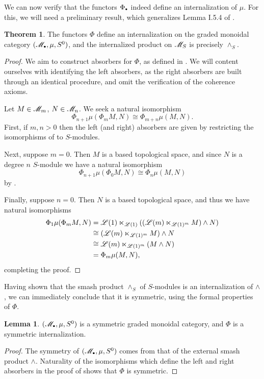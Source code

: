 \documentclass[openany, amssymb, psamsfonts]{amsart}
\theoremstyle{definition}
\newtheorem{thm}{Theorem}[section]
\newtheorem{lem}{Lemma}[section]
\numberwithin{equation}{section}
\begin{document}
We can now verify that the functors $\Phi_\sbull$ indeed define an internalization of $\mu$. For this, we will need a preliminary result, which generalizes Lemma I.5.4 of \cite{EKMM}. 

\begin{thm}\label{thm:wedgeS_internal}
    The functors $\Phi$ define an internalization on the graded monoidal category $(\scM_\sbull, \mu, S^0)$, and the internalized product on $\mathscr{M}_S$ is precisely $\wedge_S$.
\end{thm}
\begin{proof} We aim to construct absorbers for $\Phi$, as defined in . We will content ourselves with identifying the left absorbers, as the right absorbers are built through an identical procedure, and omit the verification of the coherence axioms. 

Let $M \in \mathscr{M}_m$, $N \in \mathscr{M}_n$. We seek a natural isomorphism
\begin{equation*}
    \Phi_{n + 1}\mu(\Phi_m M, N) \cong \Phi_{m + n}\mu(M, N).
\end{equation*} First, if $m, n > 0$ then the left (and right) absorbers are given by restricting the isomorphisms of  to $S$-modules.

Next, suppose $m = 0$. Then $M$ is a based topological space, and since $N$ is a degree $n$ $S$-module we have a natural isomorphism
\begin{equation*}
    \Phi_{n + 1}\mu(\Phi_0 M, N) \cong \Phi_n\mu(M, N)
\end{equation*} by .

Finally, suppose $n = 0$. Then $N$ is a based topological space, and thus we have natural isomorphisms
\begin{align*}
    \Phi_1 \mu(\Phi_m M, N) &= \mathscr{L}(1) \ltimes_{\mathscr{L}(1)} ((\mathscr{L}(m) \ltimes_{\mathscr{L}(1)^m} M) \wedge N)\\
    &\cong (\mathscr{L}(m) \ltimes_{\mathscr{L}(1)^m} M) \wedge N\\
    &\cong \mathscr{L}(m) \ltimes_{\mathscr{L}(1)^m} (M \wedge N)\\
    &= \Phi_m\mu(M, N),
\end{align*} completing the proof.
\end{proof}

Having shown that the smash product $\wedge_S$ of $S$-modules is an internalization of $\wedge$, we can immediately conclude that it is symmetric, using the formal properties of $\Phi$. 

\begin{lem} \label{lem:M_sym}
    $(\scM_\sbull, \mu, S^0) $ is a symmetric graded monoidal category, and $\Phi$ is a symmetric internalization.
\end{lem}
\begin{proof}
    The symmetry of $(\scM_\sbull, \mu, S^0)$ comes from that of the external smash product $\wedge$. Naturality of the isomorphisms which define the left and right absorbers in the proof of  shows that $\Phi$ is symmetric.
\end{proof}
\end{document}
